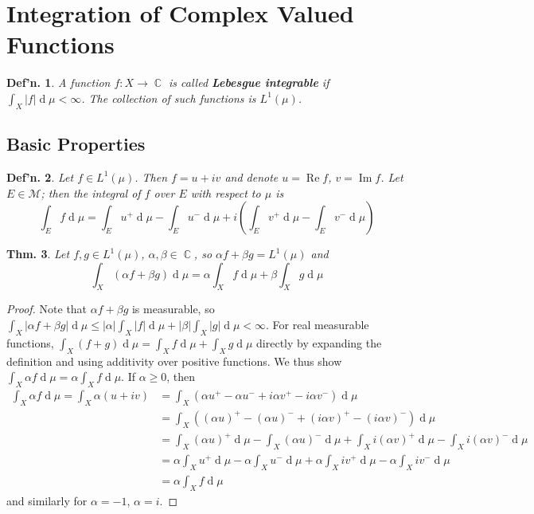 \documentclass[12pt, a4paper]{book}
\DeclareMathOperator{\C}{\mathbb{C}}
\DeclareMathOperator{\re}{Re}
\DeclareMathOperator{\im}{Im}
\renewcommand{\d}[1]{\ensuremath{\operatorname{d}\!{#1}}} %
\newtheorem{theorem}{Thm.}[section]
\newtheorem{definition}[theorem]{Def'n.}
\theoremstyle{nonumberplain}
\newtheorem{proof}{Proof}
\begin{document}
\section{Integration of Complex Valued Functions}
\begin{definition}
    A function $f:X\to\C$ is called \textbf{Lebesgue integrable} if $\int_X|f|\d{\mu}<\infty$.
    The collection of such functions is $L^1(\mu)$.
\end{definition}
\subsection{Basic Properties}
\begin{definition}
    Let $f\in L^1(\mu)$.
    Then $f=u+iv$ and denote $u=\re f$, $v=\im f$.
    Let $E\in\mathcal{M}$; then the integral of $f$ over $E$ with respect to $\mu$ is
    \[\int_Ef\d{\mu}=\int_Eu^+\d{\mu}-\int_E u^-\d{\mu}+i\left(\int_E v^+\d{\mu}-\int_E v^-\d{\mu}\right)\]
\end{definition}
\begin{theorem}
    Let $f,g\in L^1(\mu)$, $\alpha,\beta\in\C$, so $\alpha f+\beta g=L^1(\mu)$ and
    \[\int_X(\alpha f+\beta g)\d{\mu}=\alpha\int_X f\d{\mu}+\beta\int_X g\d{\mu}\]
\end{theorem}
\begin{proof}
    Note that $\alpha f+\beta g$ is measurable, so $\int_X|\alpha f+\beta g|\d{\mu}\leq |\alpha|\int_X|f|\d{\mu}+|\beta|\int_X|g|\d{\mu}<\infty$.
    For real measurable functions, $\int_X(f+g)\d{\mu}=\int_X f\d{\mu}+\int_X g\d{\mu}$ directly by expanding the definition and using additivity over positive functions.
    We thus show $\int_X\alpha f\d{\mu}=\alpha\int_Xf\d{\mu}$.
    If $\alpha\geq 0$, then
    \begin{align*}
        \int_X\alpha f\d{\mu}=\int_X\alpha(u+iv)&=\int_X(\alpha u^+-\alpha u^-+i\alpha v^+-i\alpha v^-)\d{\mu}\\
                                                &=\int_X((\alpha u)^+-(\alpha u)^-+(i\alpha v)^+-(i\alpha v)^-)\d{\mu}\\
                                                &=\int_X(\alpha u)^+\d{\mu}-\int_X(\alpha u)^-\d{\mu}+\int_Xi(\alpha v)^+\d{\mu}-\int_Xi(\alpha v)^-\d{\mu}\\
                                                &=\alpha\int_Xu^+\d{\mu}-\alpha\int_Xu^-\d{\mu}+\alpha\int_Xiv^+\d{\mu}-\alpha\int_Xiv^-\d{\mu}\\
                                                &= \alpha\int_X f\d{\mu}
    \end{align*}
    and similarly for $\alpha=-1$, $\alpha=i$.
\end{proof}
\end{document}
